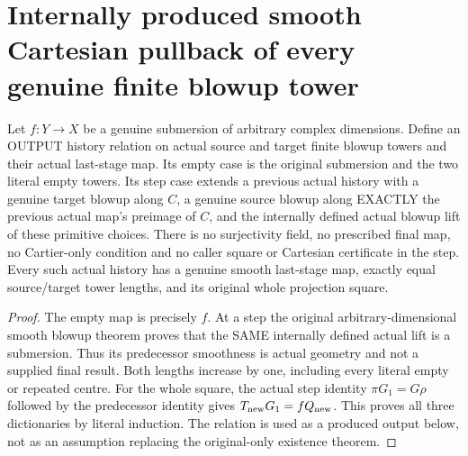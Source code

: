 \section{Internally produced smooth Cartesian pullback of every genuine finite blowup tower}

\begin{definition}
\label{hir:submersion-cartesian-tower-actual-history}
\leanok
{}
Let $f:Y\to X$ be a genuine submersion of arbitrary complex dimensions.
Define an OUTPUT history relation on actual source and target finite blowup
towers and their actual last-stage map. Its empty case is the original
submersion and the two literal empty towers. Its step case extends a
previous actual history with a genuine target blowup along $C$, a genuine
source blowup along EXACTLY the previous actual map's preimage of $C$,
and the internally defined actual blowup lift of these primitive choices.
There is no surjectivity field, no prescribed final map, no Cartier-only
condition and no caller square or Cartesian certificate in the step.
Every such actual history has a genuine smooth last-stage map, exactly
equal source/target tower lengths, and its original whole projection square.
\end{definition}
\begin{proof}
The empty map is precisely $f$. At a step the original arbitrary-dimensional
smooth blowup theorem proves that the SAME internally defined actual lift
is a submersion. Thus its predecessor smoothness is actual geometry and
not a supplied final result. Both lengths increase by one, including every
literal empty or repeated centre. For the whole square, the actual step
identity $\pi G_1=G\rho$ followed by the predecessor identity gives
$T_{\rm new}G_1=fQ_{\rm new}$. This proves all three dictionaries by literal
induction. The relation is used as a produced output below, not as an
assumption replacing the original-only existence theorem.
\end{proof}


